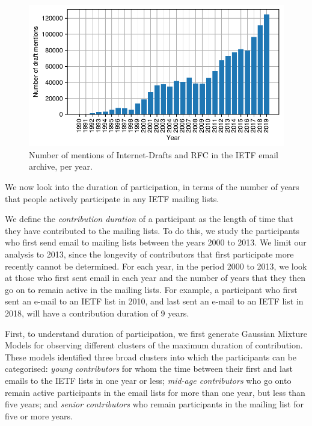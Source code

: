 \documentclass[twocolumn,10pt]{article}
\newlength{\figureWidthOneColumn}
\newcommand{\pb}[1]{\vspace{0.75ex}\noindent{\textbf{#1}}}
\begin{document}
\begin{figure}
  \centering
  \includegraphics[width=\figureWidthOneColumn]{figures-prev/imc-2021/emails/yearly-draft-mention-volume.pdf}
  \caption{
    Number of mentions of Internet-Drafts and RFC in the IETF email
    archive, per year.
  }
  \label{fig:draft_mentions}
\end{figure}

\pb{Duration of Participation:}
We now look into the duration of participation, in terms of the number of
years that people actively participate in any IETF mailing lists.

We define the \textit{contribution duration} of a participant as the length
of time that they have contributed to the mailing lists.  To do this, we
study the participants who first send email to mailing lists between the
years 2000 to 2013. We limit our analysis to 2013, since the longevity of
contributors that first participate more recently cannot be determined.
For each year, in the period 2000 to 2013, we look at those who first
sent email in each year and the number of years that they then go on to
remain active in the mailing lists. For example, a participant who first
sent an e-mail to an IETF list in 2010, and last sent an e-mail to an IETF
list in 2018, will have a contribution duration of 9 years.

First, to understand duration of participation, we first generate Gaussian
Mixture Models for observing different clusters of the maximum duration of
contribution. These models identified three broad clusters into which the
participants can be categorised: \emph{young contributors} for whom the
time between their first and last emails to the IETF lists in one year or
less; \emph{mid-age contributors} who go onto remain active participants in
the email lists for more than one year, but less than five years; and
\emph{senior contributors} who remain participants in the mailing list for
five or more years.
\end{document}
